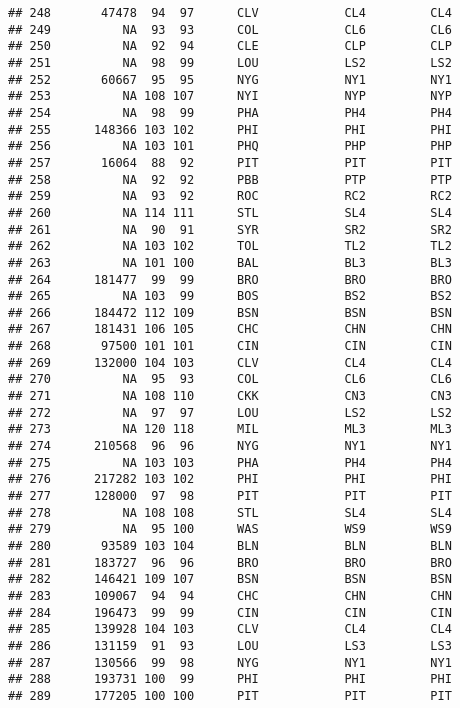 \documentclass[]{article}
\begin{document}
\begin{verbatim}
## 248       47478  94  97      CLV            CL4         CL4
## 249          NA  93  93      COL            CL6         CL6
## 250          NA  92  94      CLE            CLP         CLP
## 251          NA  98  99      LOU            LS2         LS2
## 252       60667  95  95      NYG            NY1         NY1
## 253          NA 108 107      NYI            NYP         NYP
## 254          NA  98  99      PHA            PH4         PH4
## 255      148366 103 102      PHI            PHI         PHI
## 256          NA 103 101      PHQ            PHP         PHP
## 257       16064  88  92      PIT            PIT         PIT
## 258          NA  92  92      PBB            PTP         PTP
## 259          NA  93  92      ROC            RC2         RC2
## 260          NA 114 111      STL            SL4         SL4
## 261          NA  90  91      SYR            SR2         SR2
## 262          NA 103 102      TOL            TL2         TL2
## 263          NA 101 100      BAL            BL3         BL3
## 264      181477  99  99      BRO            BRO         BRO
## 265          NA 103  99      BOS            BS2         BS2
## 266      184472 112 109      BSN            BSN         BSN
## 267      181431 106 105      CHC            CHN         CHN
## 268       97500 101 101      CIN            CIN         CIN
## 269      132000 104 103      CLV            CL4         CL4
## 270          NA  95  93      COL            CL6         CL6
## 271          NA 108 110      CKK            CN3         CN3
## 272          NA  97  97      LOU            LS2         LS2
## 273          NA 120 118      MIL            ML3         ML3
## 274      210568  96  96      NYG            NY1         NY1
## 275          NA 103 103      PHA            PH4         PH4
## 276      217282 103 102      PHI            PHI         PHI
## 277      128000  97  98      PIT            PIT         PIT
## 278          NA 108 108      STL            SL4         SL4
## 279          NA  95 100      WAS            WS9         WS9
## 280       93589 103 104      BLN            BLN         BLN
## 281      183727  96  96      BRO            BRO         BRO
## 282      146421 109 107      BSN            BSN         BSN
## 283      109067  94  94      CHC            CHN         CHN
## 284      196473  99  99      CIN            CIN         CIN
## 285      139928 104 103      CLV            CL4         CL4
## 286      131159  91  93      LOU            LS3         LS3
## 287      130566  99  98      NYG            NY1         NY1
## 288      193731 100  99      PHI            PHI         PHI
## 289      177205 100 100      PIT            PIT         PIT

\end{verbatim}
\end{document}
